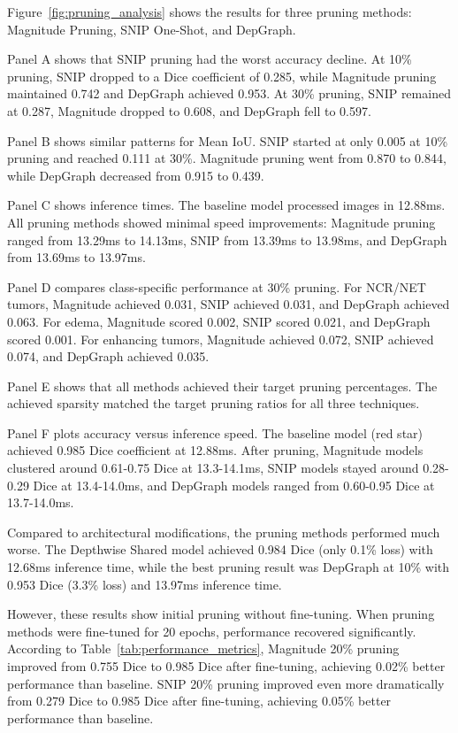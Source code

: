 \documentclass[12pt,a4paper]{article}
\begin{document}
\begin{enumerate}
Figure~\ref{fig:pruning_analysis} shows the results for three pruning methods: Magnitude Pruning, SNIP One-Shot, and DepGraph.

Panel A shows that SNIP pruning had the worst accuracy decline. At 10\% pruning, SNIP dropped to a Dice coefficient of 0.285, while Magnitude pruning maintained 0.742 and DepGraph achieved 0.953. At 30\% pruning, SNIP remained at 0.287, Magnitude dropped to 0.608, and DepGraph fell to 0.597.

Panel B shows similar patterns for Mean IoU. SNIP started at only 0.005 at 10\% pruning and reached 0.111 at 30\%. Magnitude pruning went from 0.870 to 0.844, while DepGraph decreased from 0.915 to 0.439.

Panel C shows inference times. The baseline model processed images in 12.88ms. All pruning methods showed minimal speed improvements: Magnitude pruning ranged from 13.29ms to 14.13ms, SNIP from 13.39ms to 13.98ms, and DepGraph from 13.69ms to 13.97ms.

Panel D compares class-specific performance at 30\% pruning. For NCR/NET tumors, Magnitude achieved 0.031, SNIP achieved 0.031, and DepGraph achieved 0.063. For edema, Magnitude scored 0.002, SNIP scored 0.021, and DepGraph scored 0.001. For enhancing tumors, Magnitude achieved 0.072, SNIP achieved 0.074, and DepGraph achieved 0.035.

Panel E shows that all methods achieved their target pruning percentages. The achieved sparsity matched the target pruning ratios for all three techniques.

Panel F plots accuracy versus inference speed. The baseline model (red star) achieved 0.985 Dice coefficient at 12.88ms. After pruning, Magnitude models clustered around 0.61-0.75 Dice at 13.3-14.1ms, SNIP models stayed around 0.28-0.29 Dice at 13.4-14.0ms, and DepGraph models ranged from 0.60-0.95 Dice at 13.7-14.0ms.

Compared to architectural modifications, the pruning methods performed much worse. The Depthwise Shared model achieved 0.984 Dice (only 0.1\% loss) with 12.68ms inference time, while the best pruning result was DepGraph at 10\% with 0.953 Dice (3.3\% loss) and 13.97ms inference time.

However, these results show initial pruning without fine-tuning. When pruning methods were fine-tuned for 20 epochs, performance recovered significantly. According to Table~\ref{tab:performance_metrics}, Magnitude 20\% pruning improved from 0.755 Dice to 0.985 Dice after fine-tuning, achieving 0.02\% better performance than baseline. SNIP 20\% pruning improved even more dramatically from 0.279 Dice to 0.985 Dice after fine-tuning, achieving 0.05\% better performance than baseline.


\end{enumerate}
\end{document}
